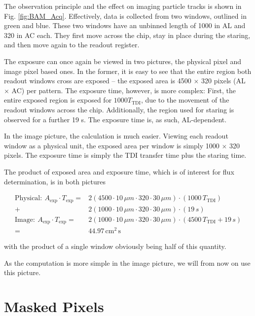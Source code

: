 \documentclass[12pt]{article}
\begin{document}
The observation principle and the effect on imaging particle tracks is shown in Fig. \ref{fig:BAM_Acq}. Effectively, data is collected from two windows, outlined in green and blue. These two windows have an unbinned length of 1000 in AL and 320 in AC each. They first move across the chip, stay in place during the staring, and then move again to the readout register.

The exposure can once again be viewed in two pictures, the physical pixel and image pixel based ones. In the former, it is easy to see that the entire region both readout windows cross are exposed -- the exposed area is 4500 $\times$ 320 pixels (AL $\times$ AC) per pattern. The exposure time, however, is more complex: First, the entire exposed region is exposed for $1000 T_\mathrm{TDI}$, due to the movement of the readout windows across the chip. Additionally, the region used for staring is observed for a further 19 s. The exposure time is, as such, AL-dependent.

In the image picture, the calculation is much easier. Viewing each readout window as a physical unit, the exposed area per window is simply 1000 $\times$ 320 pixels. The exposure time is simply the TDI transfer time plus the staring time.

The product of exposed area and exposure time, which is of interest for flux determination, is in both pictures

\begin{align}
  \mathrm{Physical: }~ A_\mathrm{exp} \cdot T_\mathrm{exp} = &2\left(4500 \cdot 10\,\mu m \cdot 320 \cdot 30\,\mu m \right) \cdot \left( 1000\, T_\mathrm{TDI} \right) \\+ &2\left( 1000 \cdot 10\,\mu m \cdot 320 \cdot 30\,\mu m\right) \cdot \left( 19\,s \right)\\
  \mathrm{Image: }~ A_\mathrm{exp} \cdot T_\mathrm{exp} = &2 \left( 1000 \cdot 10\,\mu m \cdot 320 \cdot 30\,\mu m\right) \cdot \left(4500\, T_\mathrm{TDI} + 19\,s \right)\\
  = &44.97\,\mathrm{cm^{2}\,s}
\end{align}

with the product of a single window obviously being half of this quantity.

As the computation is more simple in the image picture, we will from now on use this picture.

\section{Masked Pixels}
\end{document}
